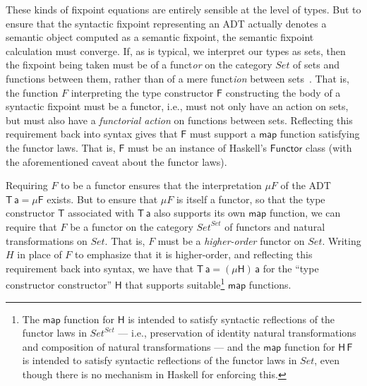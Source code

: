 \documentclass[submission,copyright,creativecommons]{eptcs}
\begin{document}
These kinds of fixpoint equations are entirely sensible at the level
of types. But to ensure that the syntactic fixpoint representing an
ADT actually denotes a semantic object computed as a semantic
fixpoint, the semantic fixpoint calculation must converge.  If, as is
typical, we interpret our types as sets, then the fixpoint being taken
must be of a funct{\em or} on the category $\mathit{Set}$ of sets and
functions between them, rather than of a mere funct{\em ion} between
sets~\cite{tfca}.  That is, the function $F$ interpreting the type
constructor $\mathsf{F}$ constructing the body of a syntactic fixpoint
must be a functor, i.e., must not only have an action on sets, but
must also have a {\em functorial action} on functions between
sets. Reflecting this requirement back into syntax gives that
$\mathsf{F}$ must support a
$\mathsf{map}$ function satisfying the functor laws. That is,
$\mathsf{F}$ must be an instance of Haskell's $\mathsf{Functor}$ class
(with the aforementioned caveat about the functor laws).

Requiring $F$ to be a functor ensures that the interpretation $\mu F$
of the ADT $\mathsf{T\,a} = \mathsf{\mu F}$ exists. But to ensure that
$\mu F$ is itself a functor, so that the type constructor $\mathsf{T}$
associated with $\mathsf{T\,a}$ also supports its own $\mathsf{map}$
function, we can require that $F$ be a functor on the category
$\mathit{Set}^\mathit{Set}$ of functors and natural transformations on
$\mathit{Set}$. That is, $F$ must be a {\em higher-order} functor on
$\mathit{Set}$. Writing $H$ in place of $F$ to emphasize that it is
higher-order, and reflecting this requirement back into syntax, we
have that $\mathsf{T\,a} = \mathsf{(\mu H)\,a}$ for the ``type
constructor constructor'' $\mathsf{H}$ that supports
suitable\footnote{The $\mathsf{map}$ function for $\mathsf{H}$ is
  intended to satisfy syntactic reflections of the functor laws in
  $\mathit{Set}^\mathit{Set}$ --- i.e., preservation of identity
  natural transformations and composition of natural transformations
  --- and the $\mathsf{map}$ function for $\mathsf{H\,F}$ is intended
  to satisfy syntactic reflections of the functor laws in
  $\mathit{Set}$, even though there is no mechanism in Haskell for
  enforcing this.} $\mathsf{map}$ functions.
\end{document}

